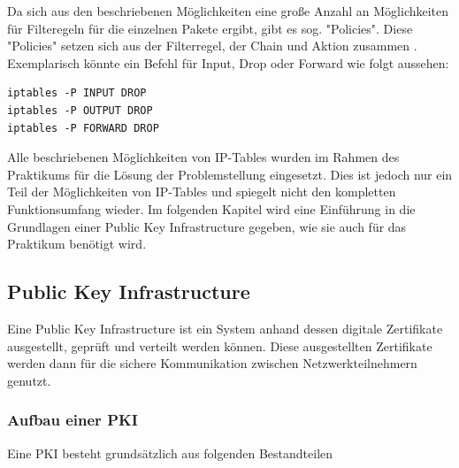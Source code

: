 \documentclass[
a4paper,     %
 headsepline, %
footsepline, %
titlepage,   %
 halfparskip,     %
 fleqn,       %
12pt         %
]{scrartcl}  %
\begin{document}
Da sich aus den beschriebenen Möglichkeiten eine große Anzahl an Möglichkeiten für Filteregeln für die einzelnen Pakete ergibt, gibt es sog. "Policies". Diese "Policies" setzen sich aus der Filterregel, der Chain und Aktion zusammen \cite{iptables-1}. Exemplarisch könnte ein Befehl für Input, Drop oder Forward wie folgt aussehen: 
\begin{lstlisting}[caption={Policies},label=lst:policy]
iptables -P INPUT DROP
iptables -P OUTPUT DROP
iptables -P FORWARD DROP
\end{lstlisting}

Alle beschriebenen Möglichkeiten von IP-Tables wurden im Rahmen des Praktikums für die Lösung der Problemstellung eingesetzt. Dies ist jedoch nur ein Teil der Möglichkeiten von IP-Tables und spiegelt nicht den kompletten Funktionsumfang wieder. 
Im folgenden Kapitel wird eine Einführung in die Grundlagen einer Public Key Infrastructure gegeben, wie sie auch für das Praktikum benötigt wird.
\subsection{Public Key Infrastructure}\label{PKI}
Eine Public Key Infrastructure ist ein System anhand dessen digitale Zertifikate ausgestellt, geprüft und verteilt werden können. Diese ausgestellten Zertifikate werden dann für die sichere Kommunikation zwischen Netzwerkteilnehmern genutzt.
\subsubsection{Aufbau einer PKI}
Eine PKI besteht grundsätzlich aus folgenden Bestandteilen
\end{document}
